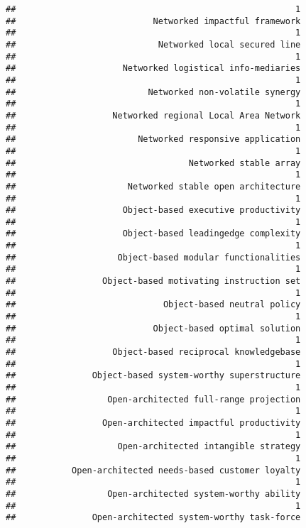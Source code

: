 \documentclass[
]{article}
\begin{document}
\begin{verbatim}
##                                                       1 
##                           Networked impactful framework 
##                                                       1 
##                            Networked local secured line 
##                                                       1 
##                     Networked logistical info-mediaries 
##                                                       1 
##                          Networked non-volatile synergy 
##                                                       1 
##                   Networked regional Local Area Network 
##                                                       1 
##                        Networked responsive application 
##                                                       1 
##                                  Networked stable array 
##                                                       1 
##                      Networked stable open architecture 
##                                                       1 
##                     Object-based executive productivity 
##                                                       1 
##                     Object-based leadingedge complexity 
##                                                       1 
##                    Object-based modular functionalities 
##                                                       1 
##                 Object-based motivating instruction set 
##                                                       1 
##                             Object-based neutral policy 
##                                                       1 
##                           Object-based optimal solution 
##                                                       1 
##                   Object-based reciprocal knowledgebase 
##                                                       1 
##               Object-based system-worthy superstructure 
##                                                       1 
##                  Open-architected full-range projection 
##                                                       1 
##                 Open-architected impactful productivity 
##                                                       1 
##                    Open-architected intangible strategy 
##                                                       1 
##           Open-architected needs-based customer loyalty 
##                                                       1 
##                  Open-architected system-worthy ability 
##                                                       1 
##               Open-architected system-worthy task-force 

\end{verbatim}
\end{document}
